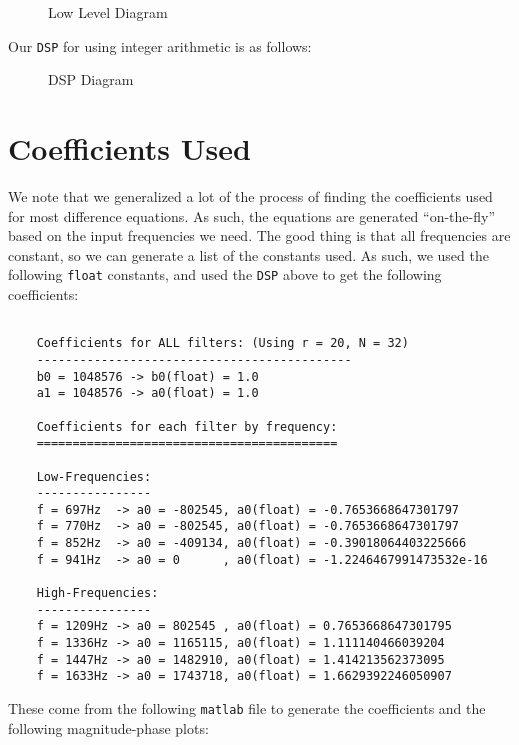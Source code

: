 \documentclass[12pt]{article}
\begin{document}
\begin{figure}[H]
    \centering 
    
    \caption{Low Level Diagram}
    \label{fig:low-level}
\end{figure}

Our \texttt{DSP} for using integer arithmetic is as follows:

\begin{figure}[H]
    \centering 
    
    \caption{DSP Diagram}
    \label{fig:dsp}
\end{figure}

\section*{Coefficients Used}

We note that we generalized a lot of the process of finding 
the coefficients used for most difference equations. As such, the 
equations are generated ``on-the-fly'' based on the input 
frequencies we need. The good thing is that all frequencies are 
constant, so we can generate a list of the constants used. As 
such, we used the following \texttt{float} constants, and used 
the \texttt{DSP} above to get the following coefficients:

\begin{verbatim}
    
    Coefficients for ALL filters: (Using r = 20, N = 32)
    --------------------------------------------
    b0 = 1048576 -> b0(float) = 1.0
    a1 = 1048576 -> a0(float) = 1.0

    Coefficients for each filter by frequency:
    ==========================================
    
    Low-Frequencies:
    ----------------
    f = 697Hz  -> a0 = -802545, a0(float) = -0.7653668647301797
    f = 770Hz  -> a0 = -802545, a0(float) = -0.7653668647301797
    f = 852Hz  -> a0 = -409134, a0(float) = -0.39018064403225666
    f = 941Hz  -> a0 = 0      , a0(float) = -1.2246467991473532e-16

    High-Frequencies:
    ----------------
    f = 1209Hz -> a0 = 802545 , a0(float) = 0.7653668647301795
    f = 1336Hz -> a0 = 1165115, a0(float) = 1.111140466039204
    f = 1447Hz -> a0 = 1482910, a0(float) = 1.414213562373095
    f = 1633Hz -> a0 = 1743718, a0(float) = 1.6629392246050907
\end{verbatim}

These come from the following \texttt{matlab} file to generate 
the coefficients and the following magnitude-phase plots:
\end{document}
